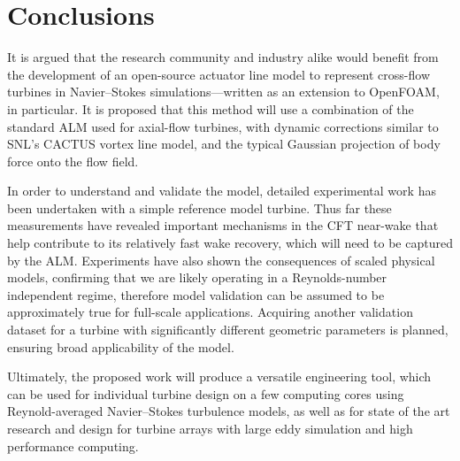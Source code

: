 \chapter{Conclusions}

It is argued that the research community and industry alike would benefit from
the development of an open-source actuator line model to represent cross-flow
turbines in Navier--Stokes simulations---written as an extension to OpenFOAM, in
particular. It is proposed that this method will use a combination of the
standard ALM used for axial-flow turbines, with dynamic corrections similar to
SNL's CACTUS vortex line model, and the typical Gaussian projection of body
force onto the flow field.

In order to understand and validate the model, detailed experimental work has
been undertaken with a simple reference model turbine. Thus far these
measurements have revealed important mechanisms in the CFT near-wake that help
contribute to its relatively fast wake recovery, which will need to be captured
by the ALM. Experiments have also shown the consequences of scaled physical
models, confirming that we are likely operating in a Reynolds-number independent
regime, therefore model validation can be assumed to be approximately true for
full-scale applications. Acquiring another validation dataset for a turbine
with significantly different geometric parameters is planned, ensuring broad
applicability of the model.

Ultimately, the proposed work will produce a versatile engineering tool, which
can be used for individual turbine design on a few computing cores using
Reynold-averaged Navier--Stokes turbulence models, as well as for state of the
art research and design for turbine arrays with large eddy simulation and high
performance computing.
